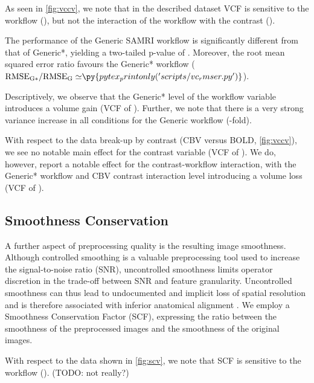 As seen in \cref{fig:vccv}, we note that in the described dataset VCF is sensitive to the workflow (),
but not the interaction of the workflow with the contrast ().

The performance of the Generic SAMRI workflow is significantly different from that of Generic*, yielding a two-tailed p-value of .
Moreover, the root mean squared error ratio favours the Generic* workflow
($\mathrm{RMSE_{G*}/RMSE_{G}\simeq} \py{pytex_printonly('scripts/vc_rmser.py')}$).

Descriptively, we observe that the Generic* level of the workflow variable introduces a volume gain
(VCF of ).
Further, we note that there is a very strong variance increase in all conditions for the Generic workflow
(-fold).

With respect to the data break-up by contrast (CBV versus BOLD, \cref{fig:vccv}), we see no notable main effect for the contrast variable
(VCF of ).
We do, however, report a notable effect for the contrast-workflow interaction, with the Generic* workflow and CBV contrast interaction level introducing a volume loss
(VCF of ).


\subsection{Smoothness Conservation}

A further aspect of preprocessing quality is the resulting image smoothness.
Although controlled smoothing is a valuable preprocessing tool used to increase the signal-to-noise ratio (SNR), uncontrolled smoothness limits operator discretion in the trade-off between SNR and feature granularity.
Uncontrolled smoothness can thus lead to undocumented and implicit loss of spatial resolution and is therefore associated with inferior anatomical alignment \cite{fmriprep}.
We employ a Smoothness Conservation Factor (SCF), expressing the ratio between the smoothness of the preprocessed images and the smoothness of the original images.

With respect to the data shown in \cref{fig:scv}, we note that SCF is sensitive to
the workflow (). (TODO: not really?)

